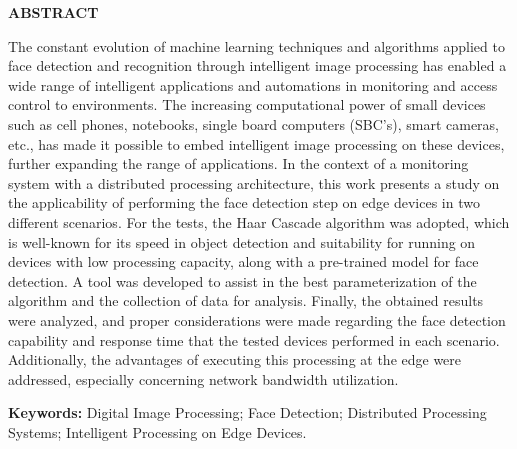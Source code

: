 \captionsenglish

\begin{center}
    \bfseries\MakeUppercase{Abstract}
\end{center}

    The constant evolution of machine learning techniques and algorithms applied to face detection and recognition through intelligent image processing has enabled a wide range of intelligent applications and automations in monitoring and access control to environments. The increasing computational power of small devices such as cell phones, notebooks, single board computers (SBC's), smart cameras, etc., has made it possible to embed intelligent image processing on these devices, further expanding the range of applications. In the context of a monitoring system with a distributed processing architecture, this work presents a study on the applicability of performing the face detection step on edge devices in two different scenarios. For the tests, the Haar Cascade algorithm was adopted, which is well-known for its speed in object detection and suitability for running on devices with low processing capacity, along with a pre-trained model for face detection. A tool was developed to assist in the best parameterization of the algorithm and the collection of data for analysis. Finally, the obtained results were analyzed, and proper considerations were made regarding the face detection capability and response time that the tested devices performed in each scenario. Additionally, the advantages of executing this processing at the edge were addressed, especially concerning network bandwidth utilization.
 \vspace{0.5cm}
 
\textbf{Keywords:} Digital Image Processing; Face Detection; Distributed Processing Systems; Intelligent Processing on Edge Devices.
\captionsbrazil